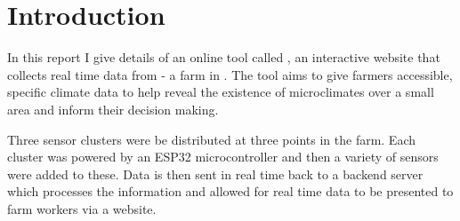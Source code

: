 \section{Introduction}

In this report I give details of an online tool called \myReportTitle, an
interactive website that collects real time data from \farmName - a farm in
\farmLocation. The tool aims to give farmers accessible, specific climate data
to help reveal the existence of microclimates over a small area and inform their
decision making.

Three sensor clusters were be distributed at three points in the farm. Each
cluster was powered by an ESP32 microcontroller and then a variety of sensors
were added to these. Data is then sent in real time back to a backend server
which processes the information and allowed for real time data to be presented
to farm workers via a website.

